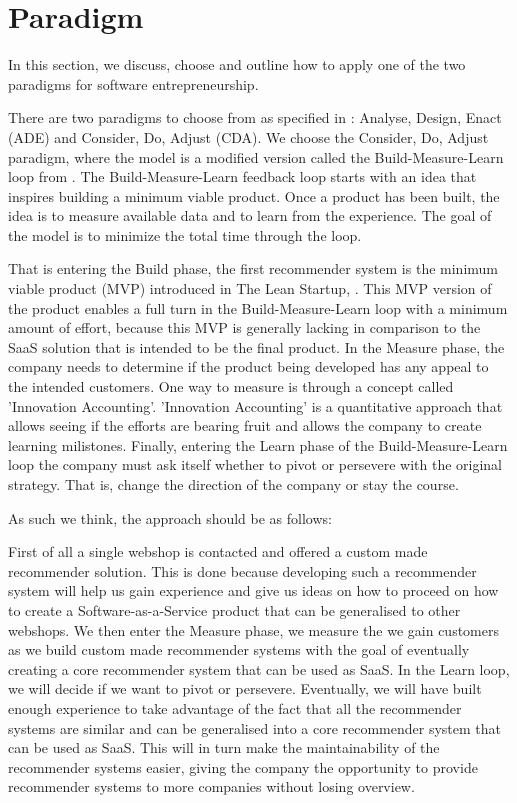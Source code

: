 \section{Paradigm}
In this section, we discuss, choose and outline how to apply one of the two paradigms for software entrepreneurship.

There are two paradigms to choose from as specified in \citet[pg. 30-32]{book:jrose}: Analyse, Design, Enact (ADE) and Consider, Do, Adjust (CDA). 
We choose the Consider, Do, Adjust paradigm, where the model is a modified version called the Build-Measure-Learn loop from \citet[pg. 75]{ries2011lean}. 
The Build-Measure-Learn feedback loop starts with an idea that inspires building a minimum viable product.
Once a product has been built, the idea is to measure available data and to learn from the experience.
The goal of the model is to minimize the total time through the loop. 

That is entering the Build phase, the first recommender system is the minimum viable product (MVP) introduced in The Lean Startup, \citep[pg. 77]{ries2011lean}.
This MVP version of the product enables a full turn in the Build-Measure-Learn loop with a minimum amount of effort, because this MVP is generally lacking in comparison to the SaaS solution that is intended to be the final product.
In the Measure phase, the company needs to determine if the product being developed has any appeal to the intended customers. 
One way to measure is through a concept called 'Innovation Accounting'\citep[pg. 77]{ries2011lean}.
'Innovation Accounting' is a quantitative approach that allows seeing if the efforts are bearing fruit and allows the company to create learning milistones. 
Finally, entering the Learn phase of the Build-Measure-Learn loop the company must ask itself whether to pivot or persevere with the original strategy.
That is, change the direction of the company or stay the course. 

As such we think, the approach should be as follows:

First of all a single webshop is contacted and offered a custom made recommender solution. 
This is done because developing such a recommender system will help us gain experience and give us ideas on how to proceed on how to create a Software-as-a-Service product that can be generalised to other webshops.
We then enter the Measure phase, we measure the we gain customers as we build custom made recommender systems with the goal of eventually creating a core recommender system that can be used as SaaS.
In the Learn loop, we will decide if we want to pivot or persevere. Eventually, we will have built enough experience to take advantage of the fact that all the recommender systems are similar and can be generalised into a core recommender system that can be used as SaaS.
This will in turn make the maintainability of the recommender systems easier, giving the company the opportunity to provide recommender systems to more companies without losing overview. 

